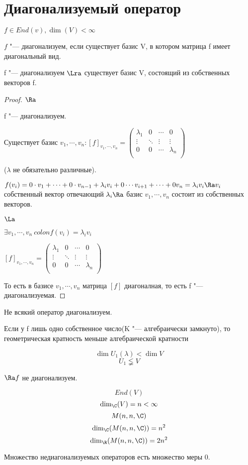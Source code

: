 ﻿\section{Диагонализуемый оператор}
\begin{Def}
$f \in End(v), \dim(V) < \infty$

$f$ "--- диагонализуем, если существует базис V, в котором
матрица f имеет диагональный вид. 
\end{Def}

\begin{theorem}{}
f "--- диагонализуем $\Lra$ существует базис V, состоящий из собственных
векторов f.
\end{theorem}
\begin{proof}
$\Ra$ 

f "--- диагонализуем.

Существует базис $v_1, \cdots, v_n \colon [f]_{v_1, \cdots, v_n} = 
\begin{pmatrix}
\lambda_1&0&\cdots&0\\
\vdots&\ddots&\vdots&\vdots\\
0&0&\cdots&\lambda_n\\
\end{pmatrix}$

($\lambda$ не обязательно различные).

$f(v_i) = 0\cdot v_1 + \cdots + 0\cdot v_{n - 1} + \lambda_i v_i + 0\cdots v_{i + 1} +  \cdots + 0v_{n} = \lambda_i v_i \Ra
v_i$ собственный вектор отвечающий $\lambda_i \Ra$ базис $v_1, \cdots, v_n$ состоит из собственных векторов.

$\La$

$\exists v_1, \cdots, v_n\ colon f(v_i) = \lambda_i v_i$

$[f]_{v_1, \cdots, v_n} = 
\begin{pmatrix}
\lambda_1&0&\cdots&0\\
\vdots&\ddots&\vdots&\vdots\\
0&0&\cdots&\lambda_n\\
\end{pmatrix}$

То есть в базисе $v_1, \cdots, v_n$ матрица $[f]$ диагоналная, то есть f "--- диагонализуемая.
\end{proof}

\begin{Rem}
Не всякий оператор диагонализуем.

Если у f лишь одно собственное число(K "--- алгебраически замкнуто), то геометрическая кратность меньше алгебраической кратности

$$\dim U_1(\lambda) < \dim V$$
$$U_1 \lneqq V$$

$\Ra f$ не диагонализуем.

$$End(V)$$
$$\dim_{\C}(V) = n < \infty$$
$$M(n, n, \C)$$
$$\dim_{\C}(M(n, n, \C)) = n^2$$
$$\dim_{\R}(M(n, n, \C)) = 2n^2$$

Множество недиагонализуемых операторов есть множество меры 0.
\end{Rem}
